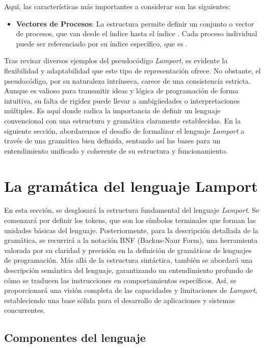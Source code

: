Aquí, las características más importantes a considerar son las siguientes:

\begin{itemize}
    \item \textbf{Vectores de Procesos}: La estructura  permite definir un conjunto o vector de procesos, que van desde el índice  hasta el índice . Cada proceso individual puede ser referenciado por su índice específico, que es .

\end{itemize}

\newpage

Tras revisar diversos ejemplos del pseudocódigo \textit{Lamport}, es evidente la flexibilidad y adaptabilidad que este tipo de representación ofrece. No obstante, el pseudocódigo, por su naturaleza intrínseca, carece de una consistencia estricta. Aunque es valioso para transmitir ideas y lógica de programación de forma intuitiva, su falta de rigidez puede llevar a ambigüedades o interpretaciones múltiples. Es aquí donde radica la importancia de definir un lenguaje convencional con una estructura y gramática claramente establecidas. En la siguiente sección, abordaremos el desafío de formalizar el lenguaje \textit{Lamport} a través de una gramática bien definida, sentando así las bases para un entendimiento unificado y coherente de su estructura y funcionamiento.

\section{La gramática del lenguaje Lamport}\label{sec:gramaticaLamport}
En esta sección, se desglosará la estructura fundamental del lenguaje \textit{Lamport}. Se comenzará por definir los tokens, que son los símbolos terminales que forman las unidades básicas del lenguaje. Posteriormente, para la descripción detallada de la gramática, se recurrirá a la notación BNF (Backus-Naur Form), una herramienta valorada por su claridad y precisión en la definición de gramáticas de lenguajes de programación. Más allá de la estructura sintáctica, también se abordará una descripción semántica del lenguaje, garantizando un entendimiento profundo de cómo se traducen las instrucciones en comportamientos específicos. Así, se proporcionará una visión completa de las capacidades y limitaciones de \textit{Lamport}, estableciendo una base sólida para el desarrollo de aplicaciones y sistemas concurrentes.

\subsection{Componentes del lenguaje}\label{subsec:componentesLamport}

